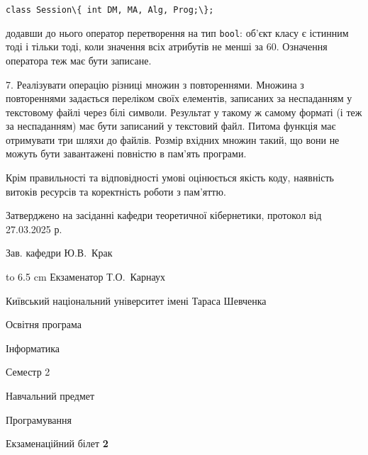 \documentclass[12pt, ukrainian]{article}
\def\code#1{\Verb!#1!}
\begin{document}
{\qquad\code{class Session\{ int DM, MA, Alg, Prog;\};} 


додавши до нього оператор перетворення на тип \code{bool}: об'єкт класу є істинним тоді і тільки тоді, коли значення всіх атрибутів не менші за 60. Означення оператора теж має бути записане.%
\par
\vspace{2mm}
7. 
Реалізувати операцію різниці множин з повтореннями. Множина з повтореннями задається переліком своїх елементів, записаних за неспаданням у текстовому файлі через білі символи. Результат у такому ж самому форматі (і теж за неспаданням) має бути записаний у текстовий файл. Питома функція має отримувати три шляхи до файлів. Розмір вхідних множин такий, що вони не можуть бути завантажені повністю в пам’ять програми.

Крім правильності та відповідності умові оцінюється якість коду, наявність витоків ресурсів та коректність роботи з пам'яттю. 

}
{\smallskip\smallskip \begin {scriptsize} Затверджено на засіданні кафедри теоретичної кібернетики, протокол   від   27.03.2025 р.\par\smallskip\smallskip\smallskip\smallskip
{\parbox {6.5 cm} {Зав. кафедри \dotfill Ю.В.~Крак}}\hspace {0.7cm} {\hbox to 6.5 cm { Екзаменатор \dotfill Т.О.~Карнаух}} \end{scriptsize}}
\newpage
{{\begin {scriptsize}\par
{ \center  Київський національний університет імені Тараса Шевченка \par}
{\parbox {5 cm}{Освітня програма \hfill}{\parbox {7 cm}{Інформатика\hfill}}\parbox {6 cm}{\hfill Семестр 2}}\par
{\parbox {5 cm} {Навчальний предмет \hfill}\parbox {7 cm}{Програмування \hfill}\parbox {6cm}{\hfill}\par}\vspace{-15pt} \end{scriptsize}}{\center Екзаменаційний білет \No \textbf { 2 }\par}}
\end{document}
